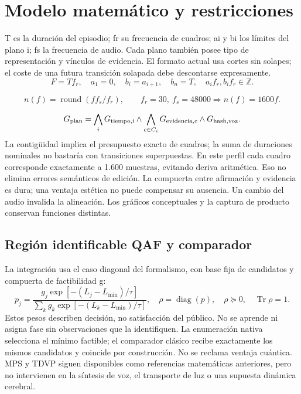 \documentclass[10pt,a4paper]{article}
\begin{document}
\section{Modelo matemático y restricciones}
T es la duración del episodio; fr su frecuencia de cuadros; ai y bi los límites del plano i; fs la frecuencia de audio. Cada plano también posee tipo de representación y vínculos de evidencia. El formato actual usa cortes sin solapes; el coste de una futura transición solapada debe descontarse expresamente.
\begin{equation}F=Tf_r,\quad a_1=0,\quad b_i=a_{i+1},\quad b_n=T,\quad a_if_r,b_if_r\in\mathbb Z.\end{equation}

\begin{equation}n(f)=\operatorname{round}(ff_s/f_r),\qquad f_r=30,\ f_s=48000\Rightarrow n(f)=1600f.\end{equation}

\begin{equation}G_{\rm plan}=\bigwedge_iG_{\rm tiempo,i}\land\bigwedge_{c\in C_i}G_{\rm evidencia,c}\land G_{\rm hash,voz}.\end{equation}
La contigüidad implica el presupuesto exacto de cuadros; la suma de duraciones nominales no bastaría con transiciones superpuestas. En este perfil cada cuadro corresponde exactamente a 1.600 muestras, evitando deriva aritmética. Eso no elimina errores semánticos de edición. La compuerta entre afirmación y evidencia es dura; una ventaja estética no puede compensar su ausencia. Un cambio del audio invalida la alineación. Los gráficos conceptuales y la captura de producto conservan funciones distintas.
\subsection{Región identificable QAF y comparador}
La integración usa el caso diagonal del formalismo, con base fija de candidatos y compuerta de factibilidad g:
\begin{equation}
p_j=\frac{g_j\exp[-(L_j-L_{\min})/\tau]}{\sum_k g_k\exp[-(L_k-L_{\min})/\tau]},\quad\rho=\operatorname{diag}(p),\quad\rho\succeq0,\quad\operatorname{Tr}\rho=1.
\end{equation}
Estos pesos describen decisión, no satisfacción del público. No se aprende ni asigna fase sin observaciones que la identifiquen. La enumeración nativa selecciona el mínimo factible; el comparador clásico recibe exactamente los mismos candidatos y coincide por construcción. No se reclama ventaja cuántica. MPS y TDVP siguen disponibles como referencias matemáticas anteriores, pero no intervienen en la síntesis de voz, el transporte de luz o una supuesta dinámica cerebral.
\end{document}
